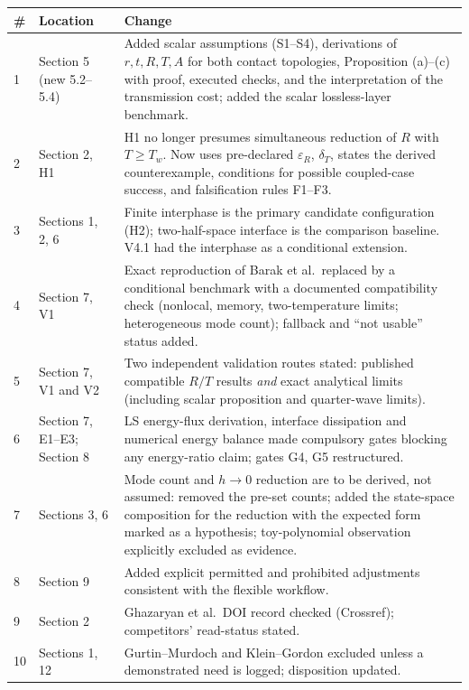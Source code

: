 \documentclass[11pt]{article}
\begin{document}
\begin{center}
\begin{tabular}{@{}p{}p{}p{}@{}}
\toprule
\# & Location & Change \\
\midrule
1 & Section 5 (new 5.2--5.4) & Added scalar assumptions (S1--S4), derivations of
  $r,t,R,T,A$ for both contact topologies, Proposition (a)--(c) with proof,
  executed checks, and the interpretation of the transmission cost; added the
  scalar lossless-layer benchmark. \\
2 & Section 2, H1 & H1 no longer presumes simultaneous reduction of $R$ with
  $T\ge T_w$. Now uses pre-declared $\varepsilon_R$, $\delta_T$, states the
  derived counterexample, conditions for possible coupled-case success, and
  falsification rules F1--F3. \\
3 & Sections 1, 2, 6 & Finite interphase is the primary candidate configuration
  (H2); two-half-space interface is the comparison baseline. V4.1 had the
  interphase as a conditional extension. \\
4 & Section 7, V1 & Exact reproduction of Barak et al.\ replaced by a conditional
  benchmark with a documented compatibility check (nonlocal, memory,
  two-temperature limits; heterogeneous mode count); fallback and ``not usable''
  status added. \\
5 & Section 7, V1 and V2 & Two independent validation routes stated: published
  compatible $R/T$ results \emph{and} exact analytical limits (including scalar
  proposition and quarter-wave limits). \\
6 & Section 7, E1--E3; Section 8 & LS energy-flux derivation, interface
  dissipation and numerical energy balance made compulsory gates blocking any
  energy-ratio claim; gates G4, G5 restructured. \\
7 & Sections 3, 6 & Mode count and $h\to0$ reduction are to be derived, not
  assumed: removed the pre-set counts; added the state-space composition for the
  reduction with the expected form marked as a hypothesis; toy-polynomial
  observation explicitly excluded as evidence. \\
8 & Section 9 & Added explicit permitted and prohibited adjustments consistent
  with the flexible workflow. \\
9 & Section 2 & Ghazaryan et al.\ DOI record checked (Crossref); competitors'
  read-status stated. \\
10 & Sections 1, 12 & Gurtin--Murdoch and Klein--Gordon excluded unless a
  demonstrated need is logged; disposition updated. \\
\bottomrule
\end{tabular}
\end{center}
\end{document}
